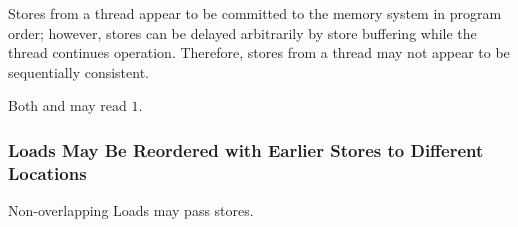 Stores from a thread appear to be committed to the memory system in program order; however, stores can be delayed arbitrarily by store buffering while the thread continues operation.
Therefore, stores from a thread may not appear to be sequentially consistent.

\begin{table}[!hbt]
\noindent{}
\caption{Stores Can Be Arbitrarily Delayed \cite[Example 3]{ref:AMD}}
\label{tbl:litmus:amd:3}
\end{table}

\noindent
Both  and  may read $1$.

\subsubsection*{Loads May Be Reordered with Earlier Stores to Different Locations}

Non-overlapping Loads may pass stores.

